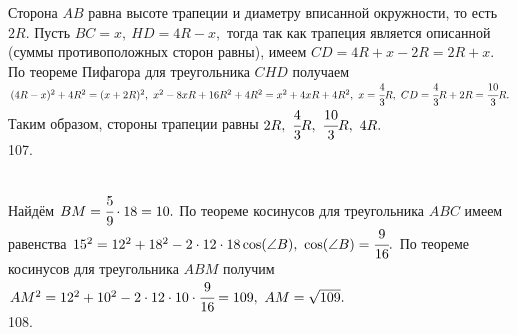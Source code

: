 \documentclass[12pt]{article}
\begin{document}
Сторона $AB$ равна высоте трапеции и диаметру вписанной окружности, то есть $2R.$ Пусть $BC=x,\ HD=4R-x,$ тогда так как трапеция является описанной (суммы противоположных сторон равны), имеем $CD=4R+x-2R=2R+x.$ По теореме Пифагора для треугольника $CHD$ получаем $(4R-x)^2+4R^2=(x+2R)^2,\
x^2-8xR+16R^2+4R^2=x^2+4xR+4R^2,\ x=\cfrac{4}{3}R,\ CD=\cfrac{4}{3}R+2R=\cfrac{10}{3}R.$ Таким образом,
стороны трапеции равны $2R,\ \cfrac{4}{3}R,\ \cfrac{10}{3}R,\ 4R.$\\
107. \begin{figure}[ht!]
\end{figure}\\
Найдём $BM=\cfrac{5}{9}\cdot18=10.$ По теореме косинусов для треугольника $ABC$ имеем равенства $15^2=12^2+18^2-2\cdot12\cdot18\cos(\angle B),\ \cos(\angle B)=\cfrac{9}{16}.$ По теореме косинусов для треугольника $ABM$ получим $AM^2=12^2+10^2-2\cdot12\cdot10\cdot\cfrac{9}{16}=109,\ AM=\sqrt{109}.$\\
108. \begin{figure}[ht!]
\end{figure}\\
\end{document}
